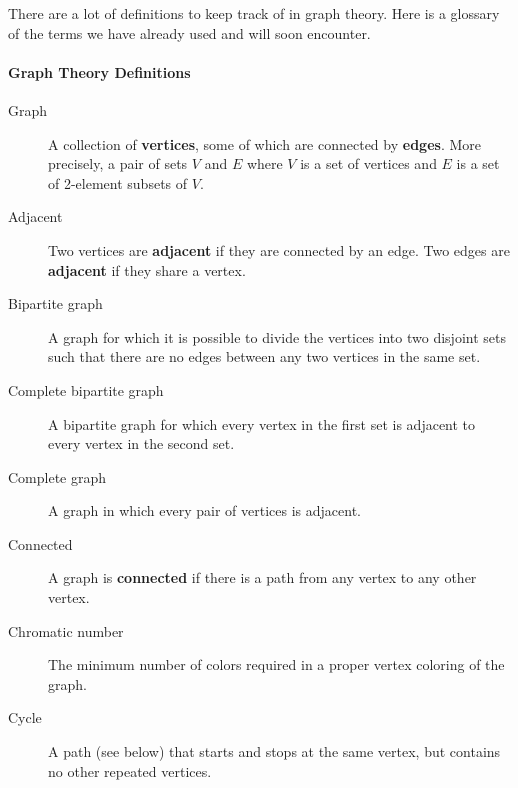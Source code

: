 \documentclass[10pt,]{book}
\newcommand{\terminology}[1]{\textbf{#1}}
\theoremstyle{plain}
\theoremstyle{definition}
\theoremstyle{definition}
\theoremstyle{definition}
\numberwithin{equation}{chapter}
\begin{document}
\par
\hypertarget{p-1339}{}%
There are a lot of definitions to keep track of in graph theory.  Here is a glossary of the terms we have already used and will soon encounter.%
\typeout{************************************************}
\typeout{************************************************}
\paragraph[{Graph Theory Definitions}]{Graph Theory Definitions}\hypertarget{paragraphs-8}{}
\hypertarget{p-1340}{}%
\leavevmode%
\begin{description}
\item[{Graph}]\hypertarget{li-48}{}\hypertarget{p-1341}{}%
 A collection of \terminology{vertices}, some of which are connected by \terminology{edges}. More precisely, a pair of sets \(V\) and \(E\) where \(V\) is a set of vertices and \(E\) is a set of 2-element subsets of \(V\).%
\item[{Adjacent}]\hypertarget{li-49}{}\hypertarget{p-1342}{}%
 Two vertices are \terminology{adjacent} if they are connected by an edge. Two edges are \terminology{adjacent} if they share a vertex.%
\item[{Bipartite graph}]\hypertarget{li-50}{}\hypertarget{p-1343}{}%
 A graph for which it is possible to divide the vertices into two disjoint sets such that there are no edges between any two vertices in the same set.%
\item[{Complete bipartite graph}]\hypertarget{li-51}{}\hypertarget{p-1344}{}%
A bipartite graph for which every vertex in the first set is adjacent to every vertex in the second set.%
\item[{Complete graph}]\hypertarget{li-52}{}\hypertarget{p-1345}{}%
 A graph in which every pair of vertices is adjacent.%
\item[{Connected}]\hypertarget{li-53}{}\hypertarget{p-1346}{}%
 A graph is \terminology{connected} if there is a path from any vertex to any other vertex.%
\item[{Chromatic number}]\hypertarget{li-54}{}\hypertarget{p-1347}{}%
 The minimum number of colors required in a proper vertex coloring of the graph.%
\item[{Cycle}]\hypertarget{li-55}{}\hypertarget{p-1348}{}%
 A path (see below) that starts and stops at the same vertex, but contains no other repeated vertices.%

\end{description}
\end{document}
